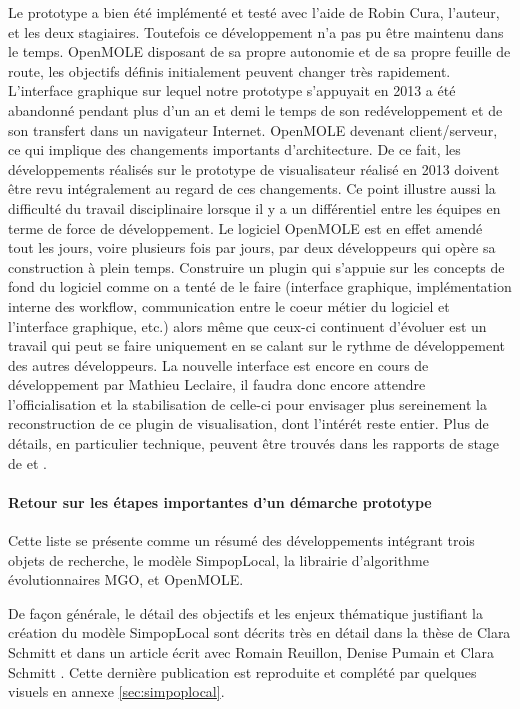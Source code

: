 Le prototype a bien été implémenté et testé avec l'aide de Robin Cura, l'auteur, et les deux stagiaires. Toutefois ce développement n'a pas pu être maintenu dans le temps. OpenMOLE disposant de sa propre autonomie et de sa propre feuille de route, les objectifs définis initialement peuvent changer très rapidement. L'interface graphique sur lequel notre prototype s'appuyait en 2013 a été abandonné pendant plus d'un an et demi le temps de son redéveloppement et de son transfert dans un navigateur Internet. OpenMOLE devenant client/serveur, ce qui implique des changements importants d'architecture. De ce fait, les développements réalisés sur le prototype de visualisateur réalisé en 2013 doivent être revu intégralement au regard de ces changements. Ce point illustre aussi la difficulté du travail disciplinaire lorsque il y a un différentiel entre les équipes en terme de force de développement. Le logiciel OpenMOLE est en effet amendé tout les jours, voire plusieurs fois par jours, par deux développeurs qui opère sa construction à plein temps. Construire un plugin qui s'appuie sur les concepts de fond du logiciel comme on a tenté de le faire (interface graphique, implémentation interne des workflow, communication entre le coeur métier du logiciel et l'interface graphique, etc.) alors même que ceux-ci continuent d'évoluer est un travail qui peut se faire uniquement en se calant sur le rythme de développement des autres développeurs. La nouvelle interface est encore en cours de développement par Mathieu Leclaire, il faudra donc encore attendre l'officialisation et la stabilisation de celle-ci pour envisager plus sereinement la reconstruction de ce plugin de visualisation, dont l'intérét reste entier. Plus de détails, en particulier technique, peuvent être trouvés dans les rapports de stage de \textcite{Bernard2013} et \textcite{Jayet2013}.

\paragraph {Retour sur les étapes importantes d'un démarche prototype}


Cette liste se présente comme un résumé des développements intégrant trois objets de recherche, le modèle SimpopLocal, la librairie d'algorithme évolutionnaires MGO, et OpenMOLE.

De façon générale, le détail des objectifs et les enjeux thématique justifiant la création du modèle SimpopLocal sont décrits très en détail dans la thèse de Clara Schmitt \autocite{Schmitt2014} et dans un article écrit avec Romain Reuillon, Denise Pumain et Clara Schmitt \autocite{Schmitt2015}. Cette dernière publication est reproduite et complété par quelques visuels en annexe \ref{sec:simpoplocal}. 

